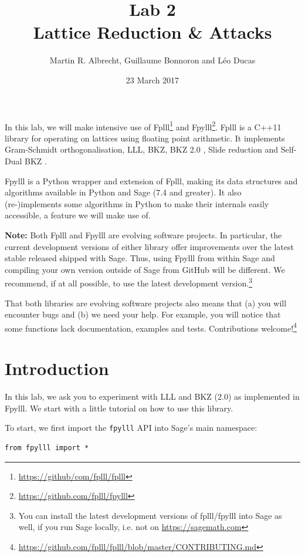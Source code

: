 \documentclass[10pt,a4paper,nobib]{tufte-handout}
\author{Martin R. Albrecht, Guillaume Bonnoron and Léo Ducas}
\date{23 March 2017}
\title{Lab 2\\\medskip
\large Lattice Reduction \& Attacks}
\begin{document}
\maketitle
In this lab, we will make intensive use of Fplll\footnote{\url{https://github/com/fplll/fplll}} and Fpylll\footnote{\url{https://github.com/fplll/fpylll}}. Fplll is a C++11 library for operating on lattices using floating point arithmetic. It implements Gram-Schmidt orthogonalisation, LLL, BKZ, BKZ 2.0 , Slide reduction  and Self-Dual BKZ .

Fpylll is a Python wrapper and extension of Fplll, making its data structures and algorithms available in Python and Sage (7.4 and greater). It also (re-)implements some algorithms in Python to make their internals easily accessible, a feature we will make use of.

\textbf{Note:} Both Fplll and Fpylll are evolving software projects. In particular, the current development versions of either library offer improvements over the latest stable released shipped with Sage. Thus, using Fpylll from within Sage and compiling your own version outside of Sage from GitHub will be different. We recommend, if at all possible, to use the latest development version.\footnote{You can install the latest development versions of fplll/fpylll into Sage as well, if you run Sage locally, i.e. not on \url{https://sagemath.com}}

That both libraries are evolving software projects also means that (a) you will encounter bugs and (b) we need your help. For example, you will notice that some functions lack documentation, examples and tests. Contributions welcome!\footnote{\url{https://github.com/fplll/fplll/blob/master/CONTRIBUTING.md}}

\section{Introduction}
\label{sec:orgaf34b74}
In this lab, we ask you to experiment with LLL and BKZ (2.0) as implemented in Fpylll. We start with a little tutorial on how to use this library. 

To start, we first import the \texttt{fpylll} API into Sage’s main namespace:

\lstset{language=sage,label= ,caption= ,captionpos=b,numbers=none}
\begin{lstlisting}
from fpylll import *
\end{lstlisting}
\end{document}
